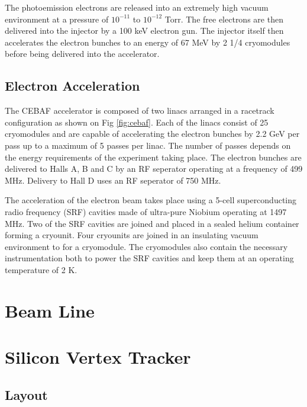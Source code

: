 The photoemission electrons are released into an extremely high vacuum
environment at a pressure of $10^{-11}$ to $10^{-12}$ Torr.  The free electrons
are then delivered into the injector by a 100 keV electron gun.  The injector
itself then accelerates the electron bunches to an energy of 67 MeV by 2 1/4
cryomodules before being delivered into the accelerator.

\subsection{Electron Acceleration}

The CEBAF accelerator is composed of two linacs arranged in a racetrack
configuration as shown on Fig \ref{fig:cebaf}. Each of the linacs consist
of 25 cryomodules and are capable of accelerating the electron bunches 
by 2.2 GeV per pass up to a maximum of 5 passes per linac.  The number of 
passes depends on the energy requirements of the experiment taking place.
The electron bunches are delivered to Halls A, B and C by an RF seperator
operating at a frequency of 499 MHz.  Delivery to Hall D uses an RF seperator
of 750 MHz.

The acceleration of the electron beam takes place using a 5-cell 
superconducting radio frequency (SRF) cavities made of ultra-pure Niobium 
operating at 1497 MHz.  Two of the SRF cavities are joined and placed in a 
sealed helium container forming a cryounit.  Four cryounits are joined in an
insulating vacuum environment to for a cryomodule.  The cryomodules also
contain the necessary instrumentation both to power the SRF cavities and keep
them at an operating temperature of 2 K.

\section{Beam Line}

\section*{Silicon Vertex Tracker}

\subsection*{Layout}

